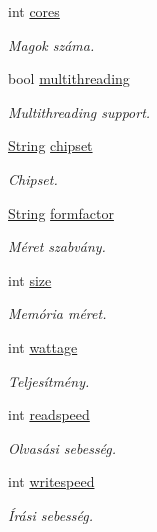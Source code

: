 \begin{DoxyCompactItemize}
int \mbox{\hyperlink{struct_temp_input_a9b99532e6c984fb19c34ed943a6d5750}{cores}}
\begin{DoxyCompactList}\small\item\em Magok száma. \end{DoxyCompactList}\item 
bool \mbox{\hyperlink{struct_temp_input_ad8957d3af0ed714844abf3f37cbfc719}{multithreading}}
\begin{DoxyCompactList}\small\item\em Multithreading support. \end{DoxyCompactList}\item 
\mbox{\hyperlink{class_string}{String}} \mbox{\hyperlink{struct_temp_input_a29da394f96dae5eaa49e145207362a9c}{chipset}}
\begin{DoxyCompactList}\small\item\em Chipset. \end{DoxyCompactList}\item 
\mbox{\hyperlink{class_string}{String}} \mbox{\hyperlink{struct_temp_input_a402c6984d9e94d4c76e460d0368613f3}{formfactor}}
\begin{DoxyCompactList}\small\item\em Méret szabvány. \end{DoxyCompactList}\item 
int \mbox{\hyperlink{struct_temp_input_adfc0eb32fac7de584c3872875b452550}{size}}
\begin{DoxyCompactList}\small\item\em Memória méret. \end{DoxyCompactList}\item 
int \mbox{\hyperlink{struct_temp_input_a2764957397bba59e827c66aeb1821279}{wattage}}
\begin{DoxyCompactList}\small\item\em Teljesítmény. \end{DoxyCompactList}\item 
int \mbox{\hyperlink{struct_temp_input_a75c5e55813802a9d6af6818de81e6001}{readspeed}}
\begin{DoxyCompactList}\small\item\em Olvasási sebesség. \end{DoxyCompactList}\item 
int \mbox{\hyperlink{struct_temp_input_a3d5511c959e7c3531ce3bea3a6248d62}{writespeed}}
\begin{DoxyCompactList}\small\item\em Írási sebesség. \end{DoxyCompactList}\item 

\end{DoxyCompactItemize}

